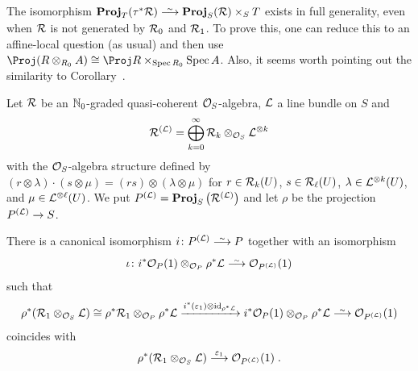 \documentclass[a4paper,parskip=half,numbers=enddot, DIV=12]{scrreprt}
\begin{document}
\begin{rem}
	The isomorphism $\PROJ_T(\tau^*\Rr)\isomorphism\PROJ_S(\Rr)\times_ST$ exists in full generality, even when $\mathcal{R}$ is not generated by $\mathcal{R}_0$ and $\mathcal{R}_1$. To prove this, one can reduce this to an affine-local question (as usual) and then use $\Proj (R\otimes_{R_0}A)\cong \Proj R\times_{\Spec R_0}\Spec A$. Also, it seems worth pointing out the similarity to Corollary~.
\end{rem}
Let $\mathcal{R}$ be an $\mathbb{N}_0$-graded quasi-coherent $\mathcal{O}_S$-algebra, $\mathcal{L}$ a line bundle on $S$ and
\begin{align*}
	\mathcal{R}^{(\mathcal{L})}=\bigoplus_{k=0}^\infty\mathcal{R}_k\otimes_{\mathcal{O}_S} \mathcal{L}^{\otimes k}
\end{align*}
with the $\mathcal{O}_S$-algebra structure defined by $(r\otimes \lambda)\cdot (s\otimes \mu)=(rs)\otimes (\lambda\otimes\mu)$ for $r\in\mathcal{R}_k(U)$, $s\in\mathcal{R}_{\ell}(U)$, $\lambda\in\mathcal{L}^{\otimes k}(U)$, and $\mu\in\mathcal{L}^{\otimes \ell}(U)$. We put $P^{(\mathcal{L})}=\operatorname{\mathbf{Proj}}_S\big(\mathcal{R}^{(\mathcal{L})}\big)$ and let $\rho$ be the projection $P^{(\Ll)}\morphism S$.
\begin{cor}
	There is a canonical isomorphism $i\colon P^{(\Ll)}\isomorphism P$ together with an isomorphism 
	\begin{align*}
		\iota\colon i^*\Oo_{P}(1)\otimes_{\Oo_{P}}\rho^*\Ll\isomorphism\Oo_{P^{(\Ll)}}(1)
	\end{align*}
	such that
	\begin{align*}
		\rho^*(\Rr_1\otimes_{\Oo_S}\Ll)\cong \rho^*\Rr_1\otimes_{\Oo_{P}}\rho^*\Ll\xrightarrow{i^*(\epsilon_1)\otimes\id_{\rho^*\Ll}}i^*\Oo_{P}(1)\otimes_{\Oo_{P}}\rho^*\Ll\isomorphism\Oo_{P^{(\Ll)}}(1)
	\end{align*}
	coincides with
	\begin{align*}
		\rho^*(\Rr_1\otimes_{\Oo_S}\Ll)\morphism[\epsilon_1]\Oo_{P^{(\Ll)}}(1)\;.
	\end{align*}
\end{cor}
\end{document}
